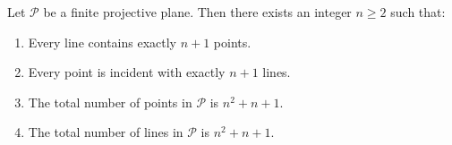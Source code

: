 Let $\mathcal{P}$ be a finite projective plane. Then there exists an integer $n \geq 2$ such that:
\begin{enumerate}
  \item[(i)] Every line contains exactly $n + 1$ points.
  \item[(ii)] Every point is incident with exactly $n + 1$ lines.
  \item[(iii)] The total number of points in $\mathcal{P}$ is $n^2 + n + 1$.
  \item[(iv)] The total number of lines in $\mathcal{P}$ is $n^2 + n + 1$.
\end{enumerate}
